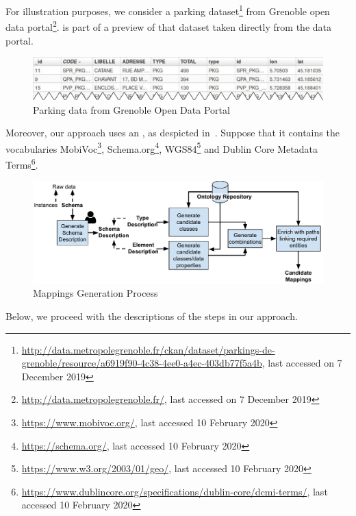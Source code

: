  For illustration purposes, we consider a parking dataset\footnote{\url{http://data.metropolegrenoble.fr/ckan/dataset/parkings-de-grenoble/resource/a6919f90-4c38-4ee0-a4ec-403db77f5a4b}, last accessed on 7 December 2019} from Grenoble open data portal\footnote{\url{http://data.metropolegrenoble.fr/}, last accessed on 7 December 2019}.  is part of a preview of that dataset taken directly from the data portal.
\begin{figure}[h]
	\centering
	\includegraphics[scale=0.45]{images/sampleRawData.pdf}
	\caption{Parking data from Grenoble Open Data Portal}
	\label{fig:sampleRawData}
\end{figure}
Moreover, our approach uses an , as despicted in~. Suppose that it contains the vocabularies MobiVoc\footnote{\url{https://www.mobivoc.org/}, last accessed 10 February 2020}, Schema.org\footnote{\url{https://schema.org/}, last accessed 10 February 2020}, WGS84\footnote{\url{https://www.w3.org/2003/01/geo/}, last accessed 10 February 2020} and Dublin Core Metadata Terms\footnote{\url{https://www.dublincore.org/specifications/dublin-core/dcmi-terms/}, last accessed 10 February 2020}. 
\begin{figure}
	\centering
	\includegraphics[scale=0.55]{images/GeneralApproachPaper1.pdf}
	\caption{Mappings Generation Process}
	\label{fig:overviewApproach}
\end{figure}

Below, we proceed with the descriptions of the steps in our approach.

